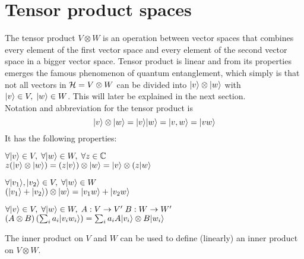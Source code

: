	\section{Tensor product spaces}
	The tensor product $V\otimes W$ is an operation between vector spaces that combines every element of the first vector space and every element of the second vector space in a bigger vector space. Tensor product is linear and from its properties emerges the famous phenomenon of quantum entanglement, which simply is that not all vectors in $\mathcal{H} = V\otimes W$ can be divided into $|v \rangle\otimes|w \rangle$ with $|v \rangle\in V,\; |w \rangle\in W$. This will later be explained in the next section.\\
	Notation and abbreviation for the tensor product is 
	$$ |v \rangle\otimes|w \rangle = |v \rangle|w \rangle = |v,w \rangle = |vw \rangle$$
	It has the following properties:
	\begin{description}
		\item $\forall|v \rangle\in V ,\; \forall|w \rangle\in W, \; \forall z\in \mathbb{C}$	\\
					$ z(|v \rangle\otimes|w \rangle) = (z|v \rangle)\otimes|w \rangle = |v \rangle\otimes(z|w \rangle $
		\item $\forall|v_1 \rangle,|v_2 \rangle\in V ,\; \forall|w \rangle\in W$	\\
					$ (|v_1 \rangle + |v_2 \rangle)\otimes|w \rangle = |v_1w \rangle + |v_2w \rangle $
		\item $\forall|v \rangle\in V ,\; \forall|w \rangle\in W, \; A:V\rightarrow V' \; B:W\rightarrow W'$	\\
					$ (A\otimes B) \left(\sum_i a_i |v_i w_i \rangle \right) = \sum_i a_i A|v_i \rangle\otimes B|w_i \rangle $
	\end{description}
	The inner product on $V$ and $W$ can be used to define (linearly) an inner product on $V\otimes W$.	
	
	

